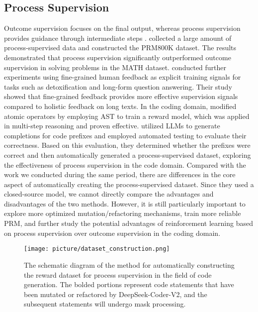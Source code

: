\subsection{Process Supervision}
Outcome supervision focuses on the final output, whereas process supervision provides guidance through intermediate steps \citep{uesato2022solving,luo2024improve,wang2024math}. 
 \citet{lightman2023let} collected a large amount of process-supervised data and constructed the PRM800K dataset. The results demonstrated that process supervision significantly outperformed outcome supervision in solving problems in the MATH dataset. \citet{wu2024fine} conducted further experiments using fine-grained human feedback as explicit training signals for tasks such as detoxification and long-form question answering. Their study showed that fine-grained feedback provides more effective supervision signals compared to holistic feedback on long texts. In the coding domain, \citet{ma2023let} modified atomic operators by employing AST to train a reward model, which was applied in multi-step reasoning and proven effective. \citet{dai2024process} utilized LLMs to generate completions for code prefixes and employed automated testing to evaluate their correctness. Based on this evaluation, they determined whether the prefixes were correct and then automatically generated a process-supervised dataset, exploring the effectiveness of process supervision in the code domain. Compared with the work we conducted during the same period, there are differences in the core aspect of automatically creating the process-supervised dataset. Since they used a closed-source model, we cannot directly compare the advantages and disadvantages of the two methods. However, it is still particularly important to explore more optimized mutation/refactoring mechanisms, train more reliable PRM, and further study the potential advantages of reinforcement learning based on process supervision over outcome supervision in the coding domain. 

\begin{figure*}[t]
  \centering
  \texttt{[image: picture/dataset\_construction.png]}
  \caption{The schematic diagram of the method for automatically constructing the reward dataset for process supervision in the field of code generation. The bolded portions represent code statements that have been mutated or refactored by DeepSeek-Coder-V2, and the subsequent statements will undergo mask processing. 
  }
  \label{fig:dataset construction}
\end{figure*}